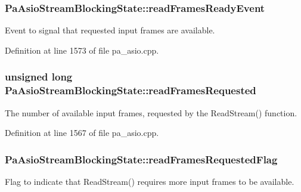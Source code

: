 \subsubsection[{\texorpdfstring{read\+Frames\+Ready\+Event}{readFramesReadyEvent}}]{ Pa\+Asio\+Stream\+Blocking\+State\+::read\+Frames\+Ready\+Event}\hypertarget{struct_pa_asio_stream_blocking_state_ab10d5241d6bc83f9ca91e8cbcff2abe6}{}\label{struct_pa_asio_stream_blocking_state_ab10d5241d6bc83f9ca91e8cbcff2abe6}
Event to signal that requested input frames are available. 

Definition at line 1573 of file pa\+\_\+asio.\+cpp.

\subsubsection[{\texorpdfstring{read\+Frames\+Requested}{readFramesRequested}}]{\setlength{\rightskip}{0pt plus 5cm}unsigned long Pa\+Asio\+Stream\+Blocking\+State\+::read\+Frames\+Requested}\hypertarget{struct_pa_asio_stream_blocking_state_a90210659b71bfbb266c89a834b6ce72b}{}\label{struct_pa_asio_stream_blocking_state_a90210659b71bfbb266c89a834b6ce72b}
The number of available input frames, requested by the Read\+Stream() function. 

Definition at line 1567 of file pa\+\_\+asio.\+cpp.

\subsubsection[{\texorpdfstring{read\+Frames\+Requested\+Flag}{readFramesRequestedFlag}}]{ Pa\+Asio\+Stream\+Blocking\+State\+::read\+Frames\+Requested\+Flag}\hypertarget{struct_pa_asio_stream_blocking_state_ac000da4cb444d7c90b6263e87566b1fb}{}\label{struct_pa_asio_stream_blocking_state_ac000da4cb444d7c90b6263e87566b1fb}
Flag to indicate that Read\+Stream() requires more input frames to be available. 


